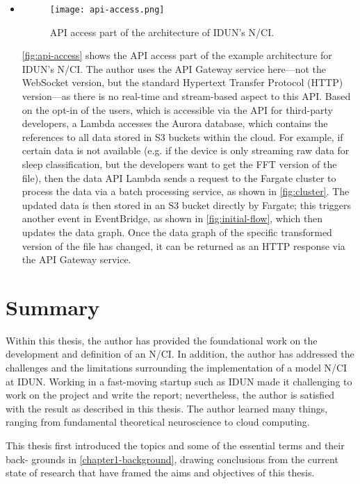 \begin{itemize}
  \item \begin{figure}[!ht]
          \centering
          \hspace*{0.4in}
          \texttt{[image: api-access.png]}
          \caption{API access part of the architecture of IDUN's N/CI.}
          \label{fig:api-access}
        \end{figure}

        \autoref{fig:api-access} shows the API access part of the example architecture for IDUN’s N/CI. The author uses the API Gateway service here—not the WebSocket version, but the standard Hypertext Transfer Protocol (HTTP) version—as there is no real-time and stream-based aspect to this API. Based on the opt-in of the users, which is accessible via the API for third-party developers, a Lambda accesses the Aurora database, which contains the references to all data stored in S3 buckets within the cloud. For example, if certain data is not available (e.g. if the device is only streaming raw data for sleep classification, but the developers want to get the FFT version of the file), then the data API Lambda sends a request to the Fargate cluster to process the data via a batch processing service, as shown in \autoref{fig:cluster}. The updated data is then stored in an S3 bucket directly by Fargate; this triggers another event in EventBridge, as shown in \autoref{fig:initial-flow}, which then updates the data graph. Once the data graph of the specific transformed version of the file has changed, it can be returned as an HTTP response via the API Gateway service.

\end{itemize}

\section{Summary}
\label{chapter5-summary}

Within this thesis, the author has provided the foundational work on the development and definition of an N/CI. In addition, the author has addressed the challenges and the limitations surrounding the implementation of a model N/CI at IDUN. Working in a fast-moving startup such as IDUN made it challenging to work on the project and write the report; nevertheless, the author is satisfied with the result as described in this thesis. The author learned many things, ranging from fundamental theoretical neuroscience to cloud computing.

This thesis first introduced the topics and some of the essential terms and their back- grounds in \autoref{chapter1-background}, drawing conclusions from the current state of research that have framed the aims and objectives of this thesis.

